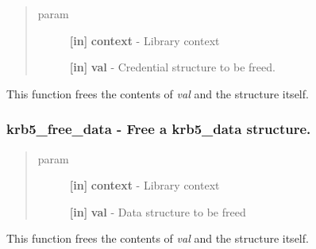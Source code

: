 \documentclass[letterpaper,10pt,english]{sphinxmanual}
\begin{document}
\begin{fulllineitems}
\label{appdev/refs/api/krb5_free_creds:krb5_free_creds}
\end{fulllineitems}

\begin{quote}\begin{description}
\item[{param}] \leavevmode
\textbf{{[}in{]}} \textbf{context} - Library context

\textbf{{[}in{]}} \textbf{val} - Credential structure to be freed.

\end{description}\end{quote}

This function frees the contents of \emph{val} and the structure itself.


\subsubsection{krb5\_free\_data -  Free a krb5\_data structure.}
\label{appdev/refs/api/krb5_free_data:krb5-free-data-free-a-krb5-data-structure}\label{appdev/refs/api/krb5_free_data::doc}

\begin{fulllineitems}
\label{appdev/refs/api/krb5_free_data:krb5_free_data}
\end{fulllineitems}

\begin{quote}\begin{description}
\item[{param}] \leavevmode
\textbf{{[}in{]}} \textbf{context} - Library context

\textbf{{[}in{]}} \textbf{val} - Data structure to be freed

\end{description}\end{quote}

This function frees the contents of \emph{val} and the structure itself.
\end{document}
